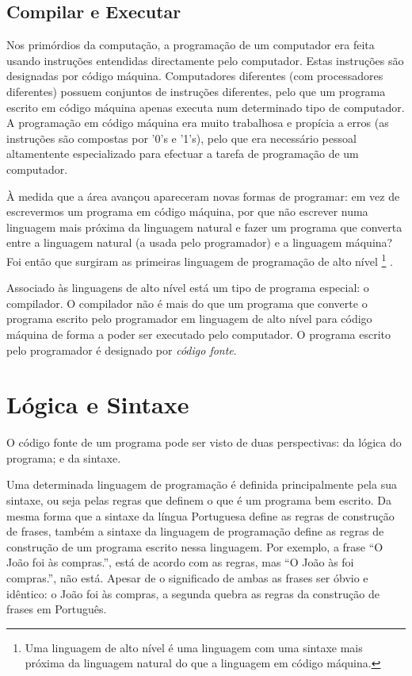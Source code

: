 \subsection{Compilar e Executar}
Nos primórdios da computação, a programação de um computador era feita usando instruções entendidas directamente pelo computador. Estas instruções são designadas por código máquina. Computadores diferentes (com processadores diferentes) possuem conjuntos de instruções diferentes, pelo que um programa escrito em código máquina apenas executa num determinado tipo de computador. 
A programação em código máquina era muito trabalhosa e propícia a erros (as instruções são compostas por '0's e '1's), pelo que era necessário pessoal altamentente especializado para efectuar a tarefa de programação de um computador.

À medida que a área avançou apareceram novas formas de programar: em vez de escrevermos um programa em código máquina, por que não escrever numa linguagem mais próxima da linguagem natural e fazer um programa que converta entre a linguagem natural (a usada pelo programador) e a linguagem máquina? Foi então que surgiram as primeiras linguagem de programação de alto nível%
\footnote{Uma linguagem de alto nível é uma linguagem com uma sintaxe mais próxima da linguagem natural do que a linguagem em código máquina.}%
.

Associado às linguagens de alto nível está um tipo de programa especial: o compilador. O compilador não é mais do que um programa que converte o programa escrito pelo programador em linguagem de alto nível para código máquina de forma a poder ser executado pelo computador. O programa escrito pelo programador é designado por \emph{código fonte}.


\section{Lógica e Sintaxe}
O código fonte de um programa pode ser visto de duas perspectivas: da lógica do programa; e da sintaxe.

Uma determinada linguagem de programação é definida principalmente pela sua sintaxe, ou seja pelas regras que definem o que é um programa bem escrito. Da mesma forma que a sintaxe da língua Portuguesa define as regras de construção de frases, também a sintaxe da linguagem de programação define as regras de construção de um programa escrito nessa linguagem. Por exemplo, a frase ``O João foi às compras.'', está de acordo com as regras, mas ``O João às foi compras.'', não está. Apesar de o significado de ambas as frases ser óbvio e idêntico: o João foi às compras, a segunda quebra as regras da construção de frases em Português.

